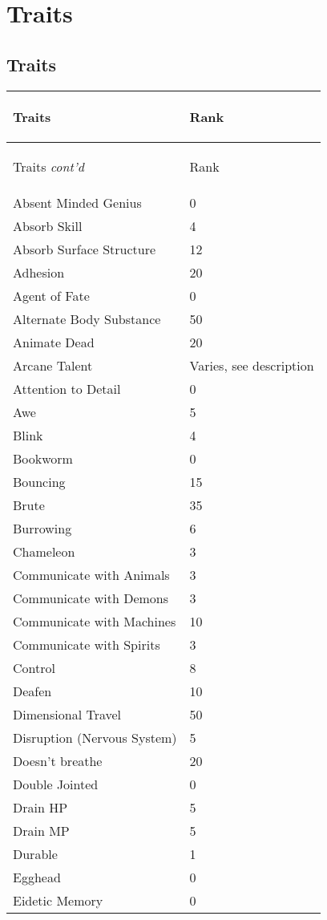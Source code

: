 \documentclass[twoside]{book}
\begin{document}
    

\chapter{Traits}
    
    

\section{Traits}
    
\begin{longtable}{p{1.25in}l} 
  Traits& \begin{turn}{70}{Rank}\end{turn}
          \\
  \hline
  \hline
  \endfirsthead
  Traits \textit{cont'd}
        & \begin{turn}{70}{Rank}\end{turn}
           \\
  \hline
  \endhead
\raggedright Absent Minded Genius&0\tabularnewline
      \raggedright Absorb Skill&4\tabularnewline
      \raggedright Absorb Surface Structure&12\tabularnewline
      \raggedright Adhesion&20\tabularnewline
      \raggedright Agent of Fate&0\tabularnewline
      \raggedright Alternate Body Substance&50\tabularnewline
      \raggedright Animate Dead&20\tabularnewline
      \raggedright Arcane Talent&Varies, see description\tabularnewline
      \raggedright Attention to Detail&0\tabularnewline
      \raggedright Awe&5\tabularnewline
      \raggedright Blink&4\tabularnewline
      \raggedright Bookworm&0\tabularnewline
      \raggedright Bouncing&15\tabularnewline
      \raggedright Brute&35\tabularnewline
      \raggedright Burrowing&6\tabularnewline
      \raggedright Chameleon&3\tabularnewline
      \raggedright Communicate with Animals&3\tabularnewline
      \raggedright Communicate with Demons&3\tabularnewline
      \raggedright Communicate with Machines&10\tabularnewline
      \raggedright Communicate with Spirits&3\tabularnewline
      \raggedright Control&8\tabularnewline
      \raggedright Deafen&10\tabularnewline
      \raggedright Dimensional Travel&50\tabularnewline
      \raggedright Disruption (Nervous System)&5\tabularnewline
      \raggedright Doesn't breathe&20\tabularnewline
      \raggedright Double Jointed&0\tabularnewline
      \raggedright Drain HP&5\tabularnewline
      \raggedright Drain MP&5\tabularnewline
      \raggedright Durable&1\tabularnewline
      \raggedright Egghead&0\tabularnewline
      \raggedright Eidetic Memory&0\tabularnewline

\end{longtable}
\end{document}
